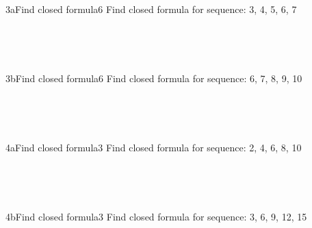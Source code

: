 \documentclass[a4paper,12pt]{book}
\begin{document}
    ~\\
    
    \hrulefill
    
    \newpage
    ~\\
    \begin{answersheetquestion}{3a}{Find closed formula}{6}
        Find closed formula for sequence: 3, 4, 5, 6, 7
        \iftoggle{answerkey}{ \begin{answer} $a_{n} = n+2$ \end{answer} }{ { ~\\ \raisebox{0pt}[2cm][0pt]{  } } }
    \end{answersheetquestion}

    ~\\
    
    \hrulefill
    
    ~\\
    \begin{answersheetquestion}{3b}{Find closed formula}{6}
        Find closed formula for sequence: 6, 7, 8, 9, 10
        \iftoggle{answerkey}{ \begin{answer} $a_{n} = n+5$ \end{answer} }{ { ~\\ \raisebox{0pt}[2cm][0pt]{  } } }
    \end{answersheetquestion}

    ~\\
    
    \hrulefill
    
    ~\\
    \begin{answersheetquestion}{4a}{Find closed formula}{3}
        Find closed formula for sequence: 2, 4, 6, 8, 10
        \iftoggle{answerkey}{ \begin{answer} $a_{n} = 2n$ \end{answer} }{ { ~\\ \raisebox{0pt}[2cm][0pt]{  } } }
    \end{answersheetquestion}

    ~\\
    
    \hrulefill
    
    ~\\
    \begin{answersheetquestion}{4b}{Find closed formula}{3}
        Find closed formula for sequence: 3, 6, 9, 12, 15
        \iftoggle{answerkey}{ \begin{answer} $a_{n} = 3n$ \end{answer} }{ { ~\\ \raisebox{0pt}[2cm][0pt]{  } } }
    \end{answersheetquestion}
\end{document}
